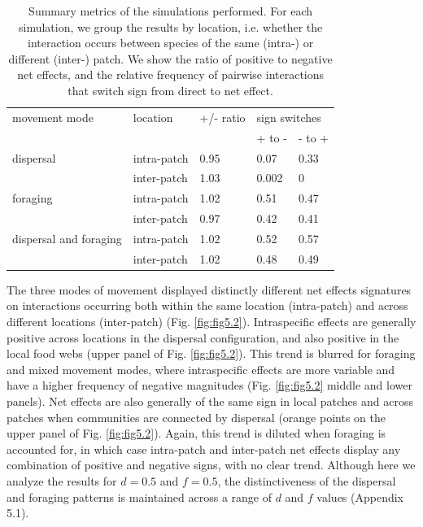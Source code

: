 \begin{table}[h]
\centering
\caption[Spatial effects summary metrics]{\color{Gray} Summary metrics of the simulations performed. For each simulation, we group the results by location, i.e. whether the interaction occurs between species of the same (intra-) or different (inter-) patch. We show the ratio of positive to negative net effects, and the relative frequency of pairwise interactions that switch sign from direct to net effect.}\label{tab:tab5.1}
\begin{tabular}{lllll}
\hline
movement mode          & location & +/- ratio & \multicolumn{2}{l}{sign switches} \\
\cline{4-5}

                       &          &           & + to -          & - to +          \\
\hline
dispersal              & intra-patch   & 0.95      & 0.07            & 0.33            \\
					  & inter-patch   & 1.03      & 0.002           & 0               \\

\hline
foraging               & intra-patch   & 1.02      & 0.51            & 0.47            \\
                       & inter-patch   & 0.97      & 0.42            & 0.41            \\

\hline
dispersal and foraging & intra-patch   & 1.02      & 0.52            & 0.57 \\
                       & inter-patch   & 1.02      & 0.48            & 0.49            \\

\end{tabular}

\end{table}

The three modes of movement displayed distinctly different net effects signatures on interactions occurring both within the same location (intra-patch) and across different locations (inter-patch) (Fig. \ref{fig:fig5.2}). Intraspecific effects are generally positive across locations in the dispersal configuration, and also positive in the local food webs (upper panel of Fig. \ref{fig:fig5.2}). This trend is blurred for foraging and mixed movement modes, where intraspecific effects are more variable and have a higher frequency of negative magnitudes (Fig. \ref{fig:fig5.2} middle and lower panels). Net effects are also generally of the same sign in local patches and across patches when communities are connected by dispersal (orange points on the upper panel of Fig. \ref{fig:fig5.2}). Again, this trend is diluted when foraging is accounted for, in which case intra-patch and inter-patch net effects display any combination of positive and negative signs, with no clear trend. Although here we analyze the results for $d = 0.5$ and $f = 0.5$, the distinctiveness of the dispersal and foraging patterns is maintained across a range of $d$ and $f$ values (Appendix 5.1).


